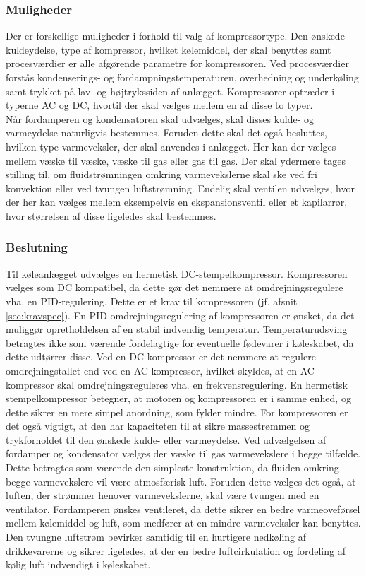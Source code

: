 \documentclass[../Hovedrapport.tex]{subfiles}
\begin{document}
\subsubsection*{Muligheder}
Der er forskellige muligheder i forhold til valg af kompressortype. Den ønskede kuldeydelse, type af kompressor, hvilket kølemiddel, der skal benyttes samt procesværdier er alle afgørende parametre for kompressoren. Ved procesværdier forstås kondenserings- og fordampningstemperaturen, overhedning og underkøling samt trykket på lav- og højtrykssiden af anlægget. Kompressorer optræder i typerne AC og DC, hvortil der skal vælges mellem en af disse to typer. \\
Når fordamperen og kondensatoren skal udvælges, skal disses kulde- og varmeydelse naturligvis bestemmes. Foruden dette skal det også besluttes, hvilken type varmeveksler, der skal anvendes i anlægget. Her kan der vælges mellem væske til væske, væske til gas eller gas til gas. Der skal ydermere tages stilling til, om fluidstrømningen omkring varmevekslerne skal ske ved fri konvektion eller ved tvungen luftstrømning. Endelig skal ventilen udvælges, hvor der her kan vælges mellem eksempelvis en ekspansionsventil eller et kapilarrør, hvor størrelsen af disse ligeledes skal bestemmes.
\subsubsection*{Beslutning}
Til køleanlægget udvælges en hermetisk DC-stempelkompressor. Kompressoren vælges som DC kompatibel, da dette gør det nemmere at omdrejningsregulere vha. en PID-regulering. Dette er et krav til kompressoren (jf. afsnit \ref{sec:kravspec}). En PID-omdrejningsregulering af kompressoren er ønsket, da det muliggør opretholdelsen af en stabil indvendig temperatur. Temperaturudsving betragtes ikke som værende fordelagtige for eventuelle fødevarer i køleskabet, da dette udtørrer disse. Ved en DC-kompressor er det nemmere at regulere omdrejningstallet end ved en AC-kompressor, hvilket skyldes, at en AC-kompressor skal omdrejningsreguleres vha. en frekvensregulering. En hermetisk stempelkompressor betegner, at motoren og kompressoren er i samme enhed, og dette sikrer en mere simpel anordning, som fylder mindre. For kompressoren er det også vigtigt, at den har kapaciteten til at sikre massestrømmen og trykforholdet til den ønskede kulde- eller varmeydelse. Ved udvælgelsen af fordamper og kondensator vælges der væske til gas varmevekslere i begge tilfælde. Dette betragtes som værende den simpleste konstruktion, da fluiden omkring begge varmevekslere vil være atmosfærisk luft. Foruden dette vælges det også, at luften, der strømmer henover varmevekslerne, skal være tvungen med en ventilator. Fordamperen ønskes ventileret, da dette sikrer en bedre varmeoveførsel mellem kølemiddel og luft, som medfører at en mindre varmeveksler kan benyttes. Den tvungne luftstrøm bevirker samtidig til en hurtigere nedkøling af drikkevarerne og sikrer ligeledes, at der en bedre luftcirkulation og fordeling af kølig luft indvendigt i køleskabet. 
\end{document}

